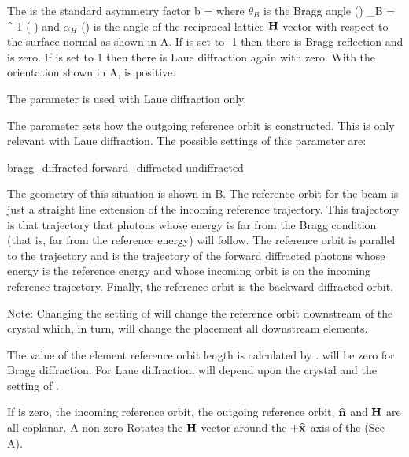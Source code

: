 The  is the standard asymmetry factor
\Begineq
  b =  
  \label{batat}
\Endeq
where $\theta_B$ is the Bragg angle () 
\Begineq
  \theta_B = \sin^{-1} \left(  \right)
\Endeq
and $\alpha_H$ () is the angle of the reciprocal
lattice ${\bf H}$ vector with respect to the surface normal as shown in
A.  If  is set to -1 then there is
Bragg reflection and  is zero. If  is set to 1
then there is Laue diffraction again with  zero. With the
orientation shown in A,  is positive.

The  parameter is used with Laue diffraction only.

The  parameter sets how the outgoing reference
orbit is constructed. This is only relevant with Laue diffraction.
The possible settings of this parameter are:
\begin{example}
  bragg_diffracted
  forward_diffracted
  undiffracted
\end{example}
The geometry of this situation is shown in B. The
reference orbit for the  beam is just a straight line
extension of the incoming reference trajectory. This trajectory is
that trajectory that photons whose energy is far from the Bragg
condition (that is, far from the reference energy) will follow. The
 reference orbit is parallel to the
 trajectory and is the trajectory of the forward
diffracted photons whose energy is the reference energy and whose
incoming orbit is on the incoming reference trajectory. Finally, the
 reference orbit is the backward diffracted orbit.

Note: Changing the setting of  will change the
reference orbit downstream of the crystal which, in turn, will change
the placement all downstream elements.

The value of the element reference orbit length  is calculated
by \bmad.  will be zero for Bragg diffraction. For Laue
diffraction,  will depend upon the crystal  and
the setting of .

If  is zero, the incoming reference orbit, the outgoing
reference orbit, ${\widehat{\bf n}}$ and ${\bf H}$ are all coplanar. A non-zero
 Rotates the ${\bf H}$ vector around the $+{\widehat{\bf x}}$ axis
of the  (See A).


